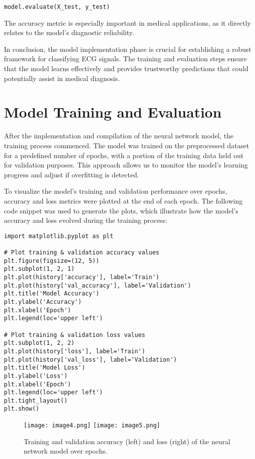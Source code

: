 \documentclass{report}
\begin{document}
\begin{verbatim}
model.evaluate(X_test, y_test)
\end{verbatim}

The accuracy metric is especially important in medical applications, as it directly relates to the model's diagnostic reliability.

In conclusion, the model implementation phase is crucial for establishing a robust framework for classifying ECG signals. The training and evaluation steps ensure that the model learns effectively and provides trustworthy predictions that could potentially assist in medical diagnosis.

\section{Model Training and Evaluation}

After the implementation and compilation of the neural network model, the training process commenced. The model was trained on the preprocessed dataset for a predefined number of epochs, with a portion of the training data held out for validation purposes. This approach allows us to monitor the model's learning progress and adjust if overfitting is detected.

To visualize the model's training and validation performance over epochs, accuracy and loss metrics were plotted at the end of each epoch. The following code snippet was used to generate the plots, which illustrate how the model's accuracy and loss evolved during the training process:

\begin{verbatim}
import matplotlib.pyplot as plt

# Plot training & validation accuracy values
plt.figure(figsize=(12, 5))
plt.subplot(1, 2, 1)
plt.plot(history['accuracy'], label='Train')
plt.plot(history['val_accuracy'], label='Validation')
plt.title('Model Accuracy')
plt.ylabel('Accuracy')
plt.xlabel('Epoch')
plt.legend(loc='upper left')

# Plot training & validation loss values
plt.subplot(1, 2, 2)
plt.plot(history['loss'], label='Train')
plt.plot(history['val_loss'], label='Validation')
plt.title('Model Loss')
plt.ylabel('Loss')
plt.xlabel('Epoch')
plt.legend(loc='upper left')
plt.tight_layout()
plt.show()
\end{verbatim}

\begin{figure}[ht]
    \centering
    \texttt{[image: image4.png]}
    \hfill
    \texttt{[image: image5.png]}
    \caption{Training and validation accuracy (left) and loss (right) of the neural network model over epochs.}
    \label{fig:model_training_evaluation}
\end{figure}
\end{document}

